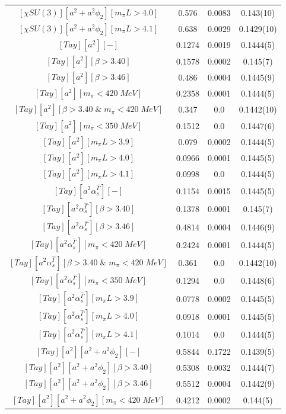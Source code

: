 \begin{longtable}{ c | c | c | c }
$[\chi SU(3)][a^2+a^2\phi_2][m_{\pi}L>4.0]$ & 0.576 & 0.0083 & 0.143(10) \\
$[\chi SU(3)][a^2+a^2\phi_2][m_{\pi}L>4.1]$ & 0.638 & 0.0029 & 0.1429(10) \\
$[Tay][a^2][-]$ & 0.1274 & 0.0019 & 0.1444(5) \\
$[Tay][a^2][\beta>3.40]$ & 0.1578 & 0.0002 & 0.145(7) \\
$[Tay][a^2][\beta>3.46]$ & 0.486 & 0.0004 & 0.1445(9) \\
$[Tay][a^2][m_{\pi}<420\;MeV]$ & 0.2358 & 0.0001 & 0.1444(5) \\
$[Tay][a^2][\beta>3.40\;\&\;m_{\pi}<420\;MeV]$ & 0.347 & 0.0 & 0.1442(10) \\
$[Tay][a^2][m_{\pi}<350\;MeV]$ & 0.1512 & 0.0 & 0.1447(6) \\
$[Tay][a^2][m_{\pi}L>3.9]$ & 0.079 & 0.0002 & 0.1444(5) \\
$[Tay][a^2][m_{\pi}L>4.0]$ & 0.0966 & 0.0001 & 0.1445(5) \\
$[Tay][a^2][m_{\pi}L>4.1]$ & 0.0998 & 0.0 & 0.1444(5) \\
$[Tay][a^2\alpha_s^{\hat{\Gamma}}][-]$ & 0.1154 & 0.0015 & 0.1445(5) \\
$[Tay][a^2\alpha_s^{\hat{\Gamma}}][\beta>3.40]$ & 0.1378 & 0.0001 & 0.145(7) \\
$[Tay][a^2\alpha_s^{\hat{\Gamma}}][\beta>3.46]$ & 0.4814 & 0.0004 & 0.1446(9) \\
$[Tay][a^2\alpha_s^{\hat{\Gamma}}][m_{\pi}<420\;MeV]$ & 0.2424 & 0.0001 & 0.1444(5) \\
$[Tay][a^2\alpha_s^{\hat{\Gamma}}][\beta>3.40\;\&\;m_{\pi}<420\;MeV]$ & 0.361 & 0.0 & 0.1442(10) \\
$[Tay][a^2\alpha_s^{\hat{\Gamma}}][m_{\pi}<350\;MeV]$ & 0.1294 & 0.0 & 0.1448(6) \\
$[Tay][a^2\alpha_s^{\hat{\Gamma}}][m_{\pi}L>3.9]$ & 0.0778 & 0.0002 & 0.1445(5) \\
$[Tay][a^2\alpha_s^{\hat{\Gamma}}][m_{\pi}L>4.0]$ & 0.0918 & 0.0001 & 0.1445(5) \\
$[Tay][a^2\alpha_s^{\hat{\Gamma}}][m_{\pi}L>4.1]$ & 0.1014 & 0.0 & 0.1444(5) \\
$[Tay][a^2][a^2+a^2\phi_2][-]$ & 0.5844 & 0.1722 & 0.1439(5) \\
$[Tay][a^2][a^2+a^2\phi_2][\beta>3.40]$ & 0.5308 & 0.0032 & 0.1444(7) \\
$[Tay][a^2][a^2+a^2\phi_2][\beta>3.46]$ & 0.5512 & 0.0004 & 0.1442(9) \\
$[Tay][a^2][a^2+a^2\phi_2][m_{\pi}<420\;MeV]$ & 0.4212 & 0.0002 & 0.144(5) \\

\end{longtable}
